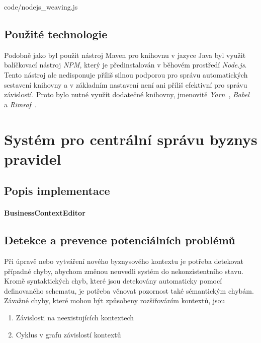 
{code/nodejs_weaving.js}

\subsection{Použité technologie}

Podobně jako byl použit nástroj Maven pro knihovnu v jazyce Java byl
využit balíčkovací nástroj \textit{NPM}, který je předinstalován
v běhovém prostředí \textit{Node.js}. Tento nástroj ale nedisponuje
příliš silnou podporou pro správu automatických sestavení knihovny
a v základním nastavení není ani příliš efektivní pro správu závislostí.
Proto bylo nutné využít dodatečné knihovny, jmenovitě
\textit{Yarn}~\cite{yarnpkg}, \textit{Babel}~\cite{babel} a
\textit{Rimraf}~\cite{rimraf}.

\section{Systém pro centrální správu byznys pravidel}




\subsection{Popis implementace}

\paragraph{BusinessContextEditor} %

\subsection{Detekce a prevence potenciálních problémů}

Při úpravě nebo vytváření nového byznysového kontextu je
potřeba detekovat případné chyby, abychom změnou neuvedli
systém do nekonzistentního stavu. Kromě syntaktických chyb,
které jsou detekovány automaticky pomocí definovaného schematu,
je potřeba věnovat pozornost také sémantickým chybám.
Závažné chyby, které mohou být způsobeny rozšiřováním kontextů, jsou
\begin{enumerate}[label=\alph*)]
    \item Závislosti na neexistujících kontextech
    \item Cyklus v grafu závislostí kontextů
\end{enumerate}

